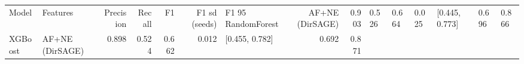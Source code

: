 \begin{tabular}{llrrrrlrr}
\toprule
Model & Features & Precision & Recall & F1 & F1 sd (seeds) & F1 95%
\midrule
RandomForest & AF+NE (DirSAGE) & 0.903 & 0.526 & 0.664 & 0.025 & [0.445, 0.773] & 0.696 & 0.866 \\
XGBoost & AF+NE (DirSAGE) & 0.898 & 0.524 & 0.662 & 0.012 & [0.455, 0.782] & 0.692 & 0.871 \\
\bottomrule
\end{tabular}
